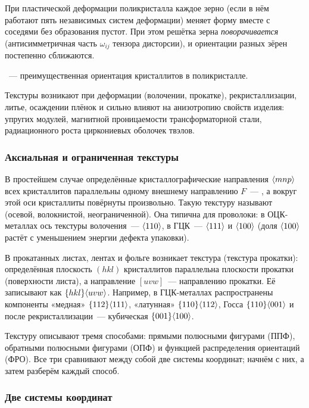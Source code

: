 При пластической деформации поликристалла каждое зерно (если в нём
работают пять независимых систем деформации) меняет форму вместе с
соседями без образования пустот. При этом решётка зерна \emph{поворачивается}
(антисимметричная часть $\omega_{ij}$ тензора дисторсии), и ориентации
разных зёрен постепенно сближаются.

\begin{opredelenie}
~— преимущественная ориентация кристаллитов в
поликристалле.
\end{opredelenie}

Текстуры возникают при деформации (волочении, прокатке), рекристаллизации,
литье, осаждении плёнок и сильно влияют на анизотропию свойств изделия:
упругих модулей, магнитной проницаемости трансформаторной стали,
радиационного роста циркониевых оболочек твэлов.

\subsubsection{Аксиальная и ограниченная текстуры}
В простейшем случае определённые кристаллографические направления
$\langle mnp\rangle$ всех кристаллитов параллельны одному внешнему направлению
$F$~— , а вокруг этой оси кристаллиты повёрнуты
произвольно. Такую текстуру называют  (осевой,
волокнистой, неограниченной). Она типична для проволоки: в ОЦК-металлах
ось текстуры волочения~— $\langle 110\rangle$, в ГЦК~— $\langle 111\rangle$ и
$\langle 100\rangle$ (доля $\langle 100\rangle$ растёт с уменьшением энергии дефекта
упаковки).

В прокатанных листах, лентах и фольге возникает 
текстура (текстура прокатки): определённая плоскость $(hkl)$
кристаллитов параллельна плоскости прокатки (поверхности листа), а
направление $[uvw]$~— направлению прокатки. Её записывают как
$\{hkl\}\langle uvw\rangle$. Например, в ГЦК-металлах распространены
компоненты «медная» $\{112\}\langle 111\rangle$, «латунная»
$\{110\}\langle 112\rangle$, Госса $\{110\}\langle 001\rangle$ и после
рекристаллизации~— кубическая $\{001\}\langle 100\rangle$.

Текстуру описывают тремя способами: прямыми полюсными фигурами (ППФ),
обратными полюсными фигурами (ОПФ) и функцией распределения ориентаций
(ФРО). Все три сравнивают между собой две системы координат; начнём с
них, а затем разберём каждый способ.

\subsubsection{Две системы координат}

